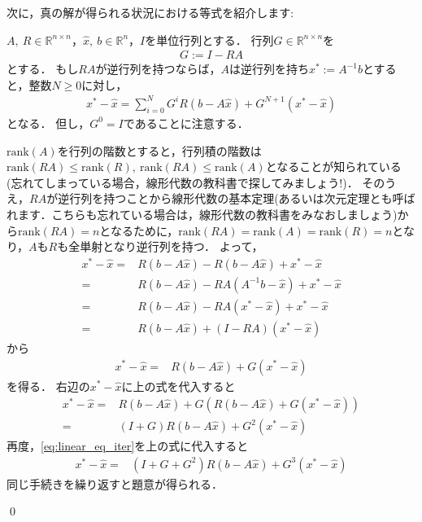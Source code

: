 次に，真の解が得られる状況における等式を紹介します:

\begin{Lem}\label{lem:linear_iter}
	$A,\ R \in {\mathbb R}^{n\times n}$，$\hat{x},\ b\in {\mathbb R}^n$，$I$を単位行列とする．	
	行列$G \in {\mathbb R}^{n\times n}$を
	\begin{align*}
		G := I - RA
	\end{align*}
	とする．
	もし$R A$が逆行列を持つならば，$A$は逆行列を持ち$x^* := A^{-1}b$とすると，整数$N \ge 0$に対し，
	\begin{align*}
		x^* - \hat{x} =  \sum_{i = 0}^N G^i R (b - A \hat{x}) + G^{N + 1}( x^* - \hat{x} )
	\end{align*}
	となる．
	但し，$G^0 = I$であることに注意する．
\end{Lem}

\begin{Proof}
	$\mbox{rank}(A)$を行列の階数とすると，行列積の階数は$\mbox{rank}(RA) \le \mbox{rank}(R), ~\mbox{rank}(RA) \le \mbox{rank}(A)$となることが知られている(忘れてしまっている場合，線形代数の教科書で探してみましょう!)．
	そのうえ，$RA$が逆行列を持つことから線形代数の基本定理(あるいは次元定理とも呼ばれます．こちらも忘れている場合は，線形代数の教科書をみなおしましょう)から$\mbox{rank}(RA) = n$となるために，$\mbox{rank}(RA) = \mbox{rank}(A) = \mbox{rank}(R) = n$となり，$A$も$R$も全単射となり逆行列を持つ．
	よって，
	\begin{align*}
		x^* - \hat{x} =& R(b - A \hat{x}) - R(b - A \hat{x}) + x^* - \hat{x} \\
		=& R(b - A \hat{x}) - RA(A^{-1}b -  \hat{x}) + x^* - \hat{x} \\
		=& R(b - A \hat{x}) - RA(x^* -  \hat{x}) + x^* - \hat{x} \\
		=&  R(b - A \hat{x}) +(I - RA) (x^* - \hat{x} )
	\end{align*}
	から
	\begin{align}\label{eq:linear_eq_iter}
		x^* - \hat{x} =&  R(b - A \hat{x}) +G (x^* - \hat{x} )
	\end{align}
	を得る．
	右辺の$x^* - \hat{x}$に上の式を代入すると
	\begin{align*}
		x^* - \hat{x} =&  R(b - A \hat{x}) +G \left( R(b - A \hat{x}) +G (x^* - \hat{x} ) \right) \\
		=& (I + G) R(b - A \hat{x}) + G^2 (x^* - \hat{x} )
	\end{align*}	
	再度，\eqref{eq:linear_eq_iter}を上の式に代入すると
	\begin{align*}
		x^* - \hat{x} =&  (I + G + G^2) R(b - A \hat{x}) + G^3 (x^* - \hat{x} )
	\end{align*}	
	同じ手続きを繰り返すと題意が得られる．
	
	\qed
\end{Proof}

